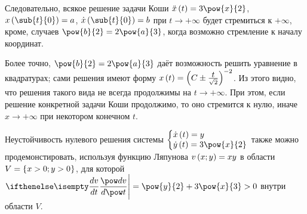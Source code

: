 \documentclass[a5paper,10pt]{article}
\begin{document}
Следовательно, всякое решение задачи Коши 
$\ddot{x}\br{t} = 3\pow{x}{2}$,
$x\br{\sub{t}{0}} = a$,
$\dot{x}\br{\sub{t}{0}} = b$
при $t \to +\infty$ будет стремиться к $+\infty$,
кроме, случаев $\pow{b}{2} = 2\pow{a}{3}$, когда возможно стремление к началу координат.

Более точно, $\pow{b}{2} = 2\pow{a}{3}$ даёт возможность решить уравнение в квадратурах; 
сами решения \linebreak имеют форму
$x\br{t} = \br{C \pm \frac {\mathlarger{t}} {\sqrt{2}}}^{-2}$. 
Из этого видно, что решения такого вида не всегда продолжимы на $t \to +\infty$. 
При этом, если решение конкретной задачи Коши продолжимо, то оно стремится к нулю, иначе 
$x \to +\infty$ при некотором конечном $t$.

Неустойчивость нулевого решения системы \linebreak
$\tsys{\dot{x}\br{t} = y \\ \dot{y}\br{t} = 3\pow{x}{2}}$
также можно продемонстировать, \linebreak используя функцию Ляпунова $v\left(\hspace{0.01em}x; y\hspace{0.01em}\right) = xy$ в области
$V = \left\{\hspace{0.03em}x > 0; y > 0\hspace{0.03em}\right\}$, для которой
$\der{v}{t} \Bigg| = \pow{y}{2} + 3\pow{x}{3} > 0$ внутри области $V$.
\end{document}
